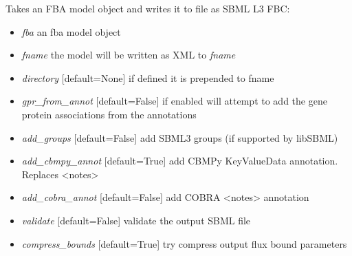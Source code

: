 \documentclass[a4paper,11pt,english]{sphinxmanual}
\begin{document}

\begin{fulllineitems}
\label{modules_doc:cbmpy.CBWrite.writeSBML3FBCV2}
Takes an FBA model object and writes it to file as SBML L3 FBC:
\begin{itemize}
\item {} 
\emph{fba} an fba model object

\item {} 
\emph{fname} the model will be written as XML to \emph{fname}

\item {} 
\emph{directory} {[}default=None{]} if defined it is prepended to fname

\item {} 
\emph{gpr\_from\_annot} {[}default=False{]} if enabled will attempt to add the gene protein associations from the annotations

\item {} 
\emph{add\_groups} {[}default=False{]} add SBML3 groups (if supported by libSBML)

\item {} 
\emph{add\_cbmpy\_annot} {[}default=True{]} add CBMPy KeyValueData annotation. Replaces \textless{}notes\textgreater{}

\item {} 
\emph{add\_cobra\_annot} {[}default=False{]} add COBRA \textless{}notes\textgreater{} annotation

\item {} 
\emph{validate} {[}default=False{]} validate the output SBML file

\item {} 
\emph{compress\_bounds} {[}default=True{]} try compress output flux bound parameters

\end{itemize}

\end{fulllineitems}

\end{document}
